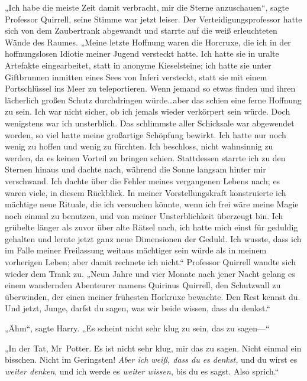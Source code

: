 „Ich habe die meiste Zeit damit verbracht, mir die Sterne anzuschauen“, sagte Professor Quirrell, seine Stimme war jetzt leiser. Der Verteidigungsprofessor hatte sich von dem Zaubertrank abgewandt und starrte auf die weiß erleuchteten Wände des Raumes. „Meine letzte Hoffnung waren die Horcruxe, die ich in der hoffnungslosen Idiotie meiner Jugend versteckt hatte. Ich hatte sie in uralte Artefakte eingearbeitet, statt in anonyme Kieselsteine; ich hatte sie unter Giftbrunnen inmitten eines Sees von Inferi versteckt, statt sie mit einem Portschlüssel ins Meer zu teleportieren. Wenn jemand so etwas finden und ihren lächerlich großen Schutz durchdringen würde…aber das schien eine ferne Hoffnung zu sein. Ich war nicht sicher, ob ich jemals wieder verkörpert sein würde. Doch wenigstens war ich unsterblich. Das schlimmste aller Schicksale war abgewendet worden, so viel hatte meine großartige Schöpfung bewirkt. Ich hatte nur noch wenig zu hoffen und wenig zu fürchten. Ich beschloss, nicht wahnsinnig zu werden, da es keinen Vorteil zu bringen schien. Stattdessen starrte ich zu den Sternen hinaus und dachte nach, während die Sonne langsam hinter mir verschwand. Ich dachte über die Fehler meines vergangenen Lebens nach; es waren viele, in diesem Rückblick. In meiner Vorstellungskraft konstruierte ich mächtige neue Rituale, die ich versuchen könnte, wenn ich frei wäre meine Magie noch einmal zu benutzen, und von meiner Unsterblichkeit überzeugt bin. Ich grübelte länger als zuvor über alte Rätsel nach, ich hatte mich einst für geduldig gehalten und lernte jetzt ganz neue Dimensionen der Geduld. Ich wusste, dass ich im Falle meiner Freilassung weitaus mächtiger sein würde als in meinem vorherigen Leben; aber damit rechnete ich nicht.“
Professor Quirrell wandte sich wieder dem Trank zu.
„Neun Jahre und vier Monate nach jener Nacht gelang es einem wandernden Abenteurer namens Quirinus Quirrell, den Schutzwall zu überwinden, der einen meiner frühesten Horkruxe bewachte. Den Rest kennst du. Und jetzt, Junge, darfst du sagen, was wir beide wissen, dass du denkst.“

„Ähm“, sagte Harry. „Es scheint nicht sehr klug zu sein, das zu sagen—“

„In der Tat, Mr~Potter. Es ist nicht sehr klug, mir das zu sagen. Nicht einmal ein bisschen. Nicht im Geringsten! \emph{Aber ich weiß, dass du es denkst,} und du wirst es \emph{weiter denken}, und ich werde es \emph{weiter wissen}, bis du es sagst. Also sprich.“

